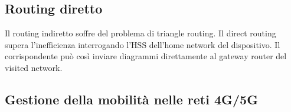 \documentclass[11pt]{book}
\begin{document}
\subsection{Routing diretto}
Il routing indiretto soffre del problema di triangle routing. Il direct routing supera l'inefficienza interrogando l'HSS
dell'home network del dispositivo. Il corrispondente può così inviare diagrammi direttamente al gateway router del visited
network.
\subsection{Gestione della mobilità nelle reti 4G/5G}
\end{document}

